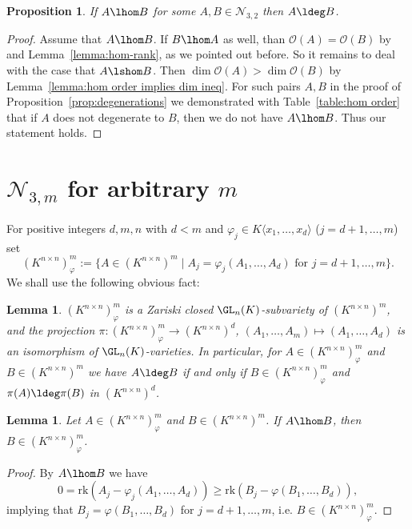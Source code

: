\documentclass[12pt]{amsart}
\newtheorem{proposition}[theorem]{\bf Proposition}
\newtheorem{lemma}[theorem]{\bf Lemma}
\newcommand{\field}{K}
\newcommand{\rank}{\mathrm{rk}}
\begin{document}
\begin{proposition} \label{prop:hom implies deg in N_{3,2}}
If $A\lhom B$ for some $A,B\in \mathcal{N}_{3,2}$  then $A\ldeg B$. 
\end{proposition}

\begin{proof} 
Assume that $A\lhom B$. If $B\lhom A$ as well, than $\mathcal{O}(A)=\mathcal{O}(B)$ by 
\cite{Auslander} and Lemma~\ref{lemma:hom-rank}, as we pointed out before. 
So it remains to deal with the case that $A\lshom B$. Then 
$\dim\mathcal{O}(A)>\dim\mathcal{O}(B)$ by Lemma~\ref{lemma:hom order implies dim ineq}. 
For such pairs $A,B$ in the proof of Proposition~\ref{prop:degenerations} we demonstrated 
with Table~\ref{table:hom order} that 
if $A$ does not degenerate to $B$, then we do not have $A\lhom B$. 
Thus our statement holds. 
\end{proof} 

\section{\texorpdfstring{$\mathcal{N}_{3,m}$}{N3m} for arbitrary \texorpdfstring{$m$}{m}}
\label{sec:N3m}

For positive integers $d,m,n$ with $d<m$ and 
$\varphi_j\in \field\langle x_1,\dots,x_d\rangle$ 
($j=d+1,\dots,m$) 
set 
\[(\field^{n\times n})^m_\varphi
:=\{A\in (K^{n\times n})^m\mid A_j
=\varphi_j(A_1,\dots,A_d)\text{ for }j=d+1,\dots,m\}.\]
We shall use the following obvious fact:

\begin{lemma} \label{lemma:G-iso}
$(\field^{n\times n})^m_\varphi$ is a Zariski closed 
$\GL_n(\field)$-subvariety of $(\field^{n\times n})^m$, 
and the projection 
$\pi:(\field^{n\times n})^m_\varphi\to (\field^{n\times n})^d$,  
$(A_1,\dots,A_m)\mapsto (A_1,\dots,A_d)$ 
is an isomorphism of $\GL_n(\field)$-varieties. 
In particular, for $A\in (\field^{n\times n})^m_\varphi$ and 
$B\in (\field^{n\times n})^m$ we have 
$A\ldeg B$ if and only if $B\in (\field^{n\times n})^m_\varphi$ and 
$\pi(A)\ldeg \pi(B)$ in $(\field^{n\times n})^d$. 
\end{lemma}

\begin{lemma}\label{lemma:hom implies phi}
Let $A\in (\field^{n\times n})^m_\varphi$ and $B\in (\field^{n\times n})^m$. 
If $A\lhom B$, then $B\in (\field^{n\times n})^m_\varphi$.    
\end{lemma}

\begin{proof}
    By $A\lhom B$ we have 
    \[0=\rank(A_j-\varphi_j(A_1,\dots,A_d))\ge \rank(B_j-\varphi(B_1,\dots,B_d)), \]
    implying that $B_j=\varphi(B_1,\dots,B_d)$ for $j=d+1,\dots,m$, i.e. 
$B\in (\field^{n\times n})^m_\varphi$. 
\end{proof}
\end{document}
